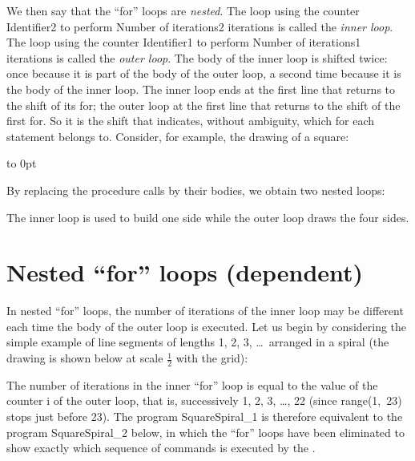 \noindent We then say that the ``for'' loops are {\em nested}.
The loop using the
counter {\small\rm Identifier2} to perform
{\small\rm Number of iterations2} iterations is called the
 {\em inner loop}. The loop using the counter {\small\rm Identifier1} to perform
{\small\rm Number of iterations1} iterations is called the {\em outer loop}.
The body of the inner loop is shifted twice: once because it is part
of the body of the outer loop, a second time because it is the body of the inner
loop. The inner loop ends at the first line that returns to the shift
of its {\mcl for}; the outer loop at the first line that returns to the shift of the
first {\mcl for}. So it is the shift that indicates, without ambiguity, which {\mcl for}
each statement belongs to. Consider, for example,
the drawing of a square:
\par\noindent\begin{minipage}{\linewidth}
\vbox to 0pt{}%

\end{minipage}

By replacing the procedure calls by their bodies, we obtain
two nested loops:



The inner loop is used to build one side while the
outer loop draws the four sides.

\newpage
\section{Nested ``for'' loops (dependent)}

In nested ``for'' loops, the number of iterations
of the in\-ner loop may be dif\-fer\-ent each time the body of
the outer loop is executed. Let us begin by considering the simple
example of line segments of lengths 1, 2, 3, \ldots\ arranged in a spiral
(the drawing is shown below at scale $\frac{1}{2}$ with the grid):\\[5cm]
%
\vspace*{-5cm}%

\vspace{2.6cm}%

The number of iterations in the inner ``for'' loop is equal to the value
of the counter {\idt i} of the outer loop, that is, successively 1, 2,
3, \ldots, 22 (since {\idt range(1,\ 23)} stops just before 23). The program {\idt SquareSpiral\_1} is therefore equivalent to the
program {\idt SquareSpiral\_2} below, in which the ``for'' loops have been
eliminated to show exactly which sequence of commands is executed
by the \robot.

